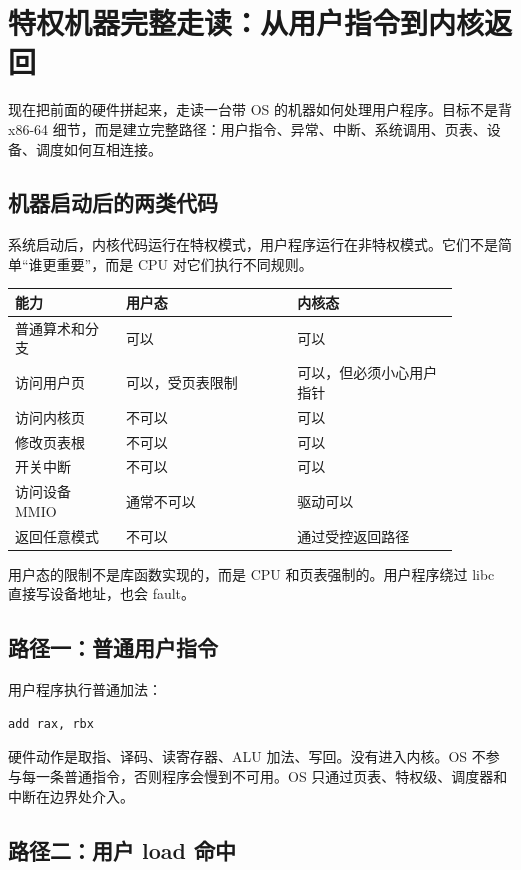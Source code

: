 \section{特权机器完整走读：从用户指令到内核返回}

现在把前面的硬件拼起来，走读一台带 OS 的机器如何处理用户程序。目标不是背 x86-64 细节，而是建立完整路径：用户指令、异常、中断、系统调用、页表、设备、调度如何互相连接。

\subsection{机器启动后的两类代码}

系统启动后，内核代码运行在特权模式，用户程序运行在非特权模式。它们不是简单“谁更重要”，而是 CPU 对它们执行不同规则。

\begin{longtable}{p{0.22\linewidth}p{0.34\linewidth}p{0.32\linewidth}}
\toprule
能力 & 用户态 & 内核态 \\
\midrule
普通算术和分支 & 可以 & 可以 \\
访问用户页 & 可以，受页表限制 & 可以，但必须小心用户指针 \\
访问内核页 & 不可以 & 可以 \\
修改页表根 & 不可以 & 可以 \\
开关中断 & 不可以 & 可以 \\
访问设备 MMIO & 通常不可以 & 驱动可以 \\
返回任意模式 & 不可以 & 通过受控返回路径 \\
\bottomrule
\end{longtable}

用户态的限制不是库函数实现的，而是 CPU 和页表强制的。用户程序绕过 libc 直接写设备地址，也会 fault。

\subsection{路径一：普通用户指令}

用户程序执行普通加法：

\begin{lstlisting}
add rax, rbx
\end{lstlisting}

硬件动作是取指、译码、读寄存器、ALU 加法、写回。没有进入内核。OS 不参与每一条普通指令，否则程序会慢到不可用。OS 只通过页表、特权级、调度器和中断在边界处介入。

\subsection{路径二：用户 load 命中}

